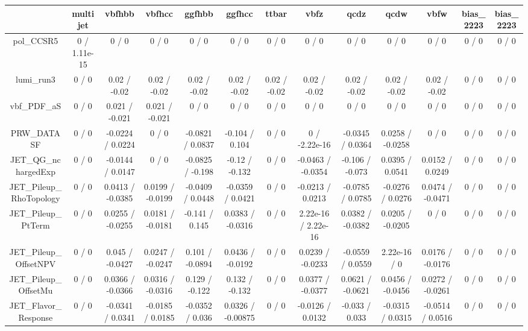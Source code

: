 \documentclass[10pt]{article}
\begin{document}
\begin{table}[htbp]
\begin{center}
\begin{tabular}{|c|c|c|c|c|c|c|c|c|c|c|c|c|}
\hline 
      & multijet      & vbfhbb      & vbfhcc      & ggfhbb      & ggfhcc      & ttbar      & vbfz      & qcdz      & qcdw      & vbfw      & bias_2223      & bias_2223 \\ 
\hline 
  pol_CCSR5 & 0 / 1.11e-15 & 0 / 0 & 0 / 0 & 0 / 0 & 0 / 0 & 0 / 0 & 0 / 0 & 0 / 0 & 0 / 0 & 0 / 0 & 0 / 0 & 0 / 0 \\ 
  lumi_run3 & 0 / 0 & 0.02 / -0.02 & 0.02 / -0.02 & 0.02 / -0.02 & 0.02 / -0.02 & 0.02 / -0.02 & 0.02 / -0.02 & 0.02 / -0.02 & 0.02 / -0.02 & 0.02 / -0.02 & 0 / 0 & 0 / 0 \\ 
  vbf_PDF_aS & 0 / 0 & 0.021 / -0.021 & 0.021 / -0.021 & 0 / 0 & 0 / 0 & 0 / 0 & 0 / 0 & 0 / 0 & 0 / 0 & 0 / 0 & 0 / 0 & 0 / 0 \\ 
  PRW_DATASF & 0 / 0 & -0.0224 / 0.0224 & 0 / 0 & -0.0821 / 0.0837 & -0.104 / 0.104 & 0 / 0 & 0 / -2.22e-16 & -0.0345 / 0.0364 & 0.0258 / -0.0258 & 0 / 0 & 0 / 0 & 0 / 0 \\ 
  JET_QG_nchargedExp & 0 / 0 & -0.0144 / 0.0147 & 0 / 0 & -0.0825 / -0.198 & -0.12 / -0.132 & 0 / 0 & -0.0463 / -0.0354 & -0.106 / -0.073 & 0.0395 / 0.0541 & 0.0152 / 0.0249 & 0 / 0 & 0 / 0 \\ 
  JET_Pileup_RhoTopology & 0 / 0 & 0.0413 / -0.0385 & 0.0199 / -0.0199 & -0.0409 / 0.0448 & -0.0359 / 0.0421 & 0 / 0 & -0.0213 / 0.0213 & -0.0785 / 0.0785 & -0.0276 / 0.0276 & 0.0474 / -0.0471 & 0 / 0 & 0 / 0 \\ 
  JET_Pileup_PtTerm & 0 / 0 & 0.0255 / -0.0255 & 0.0181 / -0.0181 & -0.141 / 0.145 & 0.0383 / -0.0316 & 0 / 0 & 2.22e-16 / 2.22e-16 & 0.0382 / -0.0382 & 0.0205 / -0.0205 & 0 / 0 & 0 / 0 & 0 / 0 \\ 
  JET_Pileup_OffsetNPV & 0 / 0 & 0.045 / -0.0427 & 0.0247 / -0.0247 & 0.101 / -0.0894 & 0.0436 / -0.0192 & 0 / 0 & 0.0239 / -0.0233 & -0.0559 / 0.0559 & 2.22e-16 / 0 & 0.0176 / -0.0176 & 0 / 0 & 0 / 0 \\ 
  JET_Pileup_OffsetMu & 0 / 0 & 0.0366 / -0.0366 & 0.0316 / -0.0316 & 0.129 / -0.122 & 0.132 / -0.132 & 0 / 0 & 0.0377 / -0.0377 & 0.0621 / -0.0621 & 0.0456 / -0.0456 & 0.0272 / -0.0261 & 0 / 0 & 0 / 0 \\ 
  JET_Flavor_Response & 0 / 0 & -0.0341 / 0.0341 & -0.0185 / 0.0185 & -0.0352 / 0.036 & 0.0326 / -0.00875 & 0 / 0 & -0.0126 / 0.0132 & -0.033 / 0.033 & -0.0315 / 0.0315 & -0.0514 / 0.0516 & 0 / 0 & 0 / 0 \\ 

\end{tabular}
\end{center}
\end{table}
\end{document}
